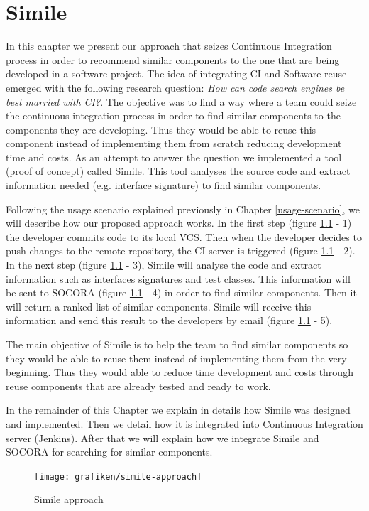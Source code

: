 \chapter{Simile}
\label{chap:simile}
In this chapter we present our approach that seizes Continuous Integration process in order to recommend similar components to the one that are being developed in a software project. The idea of integrating CI and Software reuse emerged with the following research question: \emph{How can code search engines be best married with CI?}. The objective was to find a way where a team could seize the continuous integration process in order to find similar components to the components they are developing. Thus they would be able to reuse this component instead of implementing them from scratch reducing development time and costs. As an attempt to answer the question we implemented a tool (proof of concept) called Simile. This tool analyses the source code and extract information needed (e.g. interface signature) to find similar components.

Following the usage scenario explained previously in Chapter \ref{usage-scenario}, we will describe how our proposed approach works. In the first step (figure \ref{fig:simile-01} - 1) the developer commits code to its local VCS. Then when the developer decides to push changes to the remote repository, the CI server is triggered (figure \ref{fig:simile-01} - 2). In the next step (figure \ref{fig:simile-01} - 3), Simile will analyse the code and extract information such as interfaces signatures and test classes. This information will be sent to SOCORA (figure \ref{fig:simile-01} - 4) in order to find similar components. Then it will return a ranked list of similar components. Simile will receive this information and send this result to the developers by email (figure \ref{fig:simile-01} - 5).

The main objective of Simile is to help the team to find similar components so they would be able to reuse them instead of implementing them from the very beginning. Thus they would able to reduce time development and costs through reuse components that are already tested and ready to work.

In the remainder of this Chapter we explain in details how Simile was designed and implemented. Then we detail how it is integrated into Continuous Integration server (Jenkins). After that we will explain how we integrate Simile and SOCORA for searching for similar components.

\begin{figure}[H]
	\centering
    \texttt{[image: grafiken/simile-approach]}
    \caption{Simile approach}
    \label{fig:simile-01}
\end{figure}

